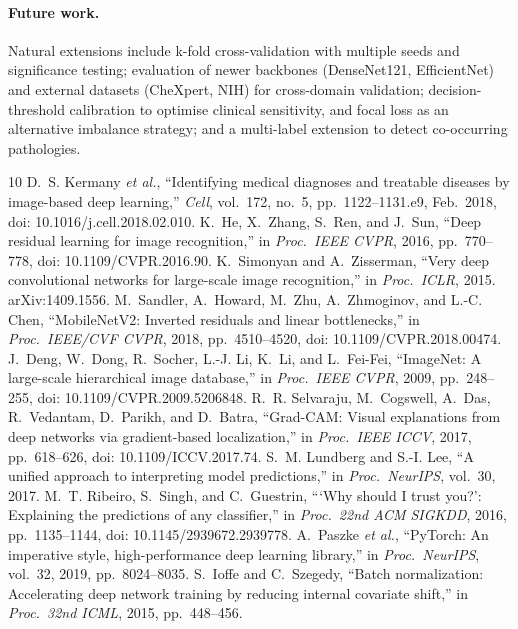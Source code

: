 \documentclass[11pt,a4paper]{article}
\numberwithin{figure}{section}
\numberwithin{table}{section}
\begin{document}
\paragraph{Future work.} Natural extensions include k-fold cross-validation with multiple seeds and
significance testing; evaluation of newer backbones (DenseNet121, EfficientNet) and external datasets
(CheXpert, NIH) for cross-domain validation; decision-threshold calibration to optimise clinical
sensitivity, and focal loss as an alternative imbalance strategy; and a multi-label extension to detect
co-occurring pathologies.

\clearpage
{}
{}
\begin{thebibliography}{10}
 D.~S. Kermany \textit{et al.}, ``Identifying medical diagnoses and treatable diseases by image-based deep learning,'' \textit{Cell}, vol.~172, no.~5, pp.~1122--1131.e9, Feb.\ 2018, doi: 10.1016/j.cell.2018.02.010.
 K.~He, X.~Zhang, S.~Ren, and J.~Sun, ``Deep residual learning for image recognition,'' in \textit{Proc.\ IEEE CVPR}, 2016, pp.~770--778, doi: 10.1109/CVPR.2016.90.
 K.~Simonyan and A.~Zisserman, ``Very deep convolutional networks for large-scale image recognition,'' in \textit{Proc.\ ICLR}, 2015. arXiv:1409.1556.
 M.~Sandler, A.~Howard, M.~Zhu, A.~Zhmoginov, and L.-C. Chen, ``MobileNetV2: Inverted residuals and linear bottlenecks,'' in \textit{Proc.\ IEEE/CVF CVPR}, 2018, pp.~4510--4520, doi: 10.1109/CVPR.2018.00474.
 J.~Deng, W.~Dong, R.~Socher, L.-J. Li, K.~Li, and L.~Fei-Fei, ``ImageNet: A large-scale hierarchical image database,'' in \textit{Proc.\ IEEE CVPR}, 2009, pp.~248--255, doi: 10.1109/CVPR.2009.5206848.
 R.~R. Selvaraju, M.~Cogswell, A.~Das, R.~Vedantam, D.~Parikh, and D.~Batra, ``Grad-CAM: Visual explanations from deep networks via gradient-based localization,'' in \textit{Proc.\ IEEE ICCV}, 2017, pp.~618--626, doi: 10.1109/ICCV.2017.74.
 S.~M. Lundberg and S.-I. Lee, ``A unified approach to interpreting model predictions,'' in \textit{Proc.\ NeurIPS}, vol.~30, 2017.
 M.~T. Ribeiro, S.~Singh, and C.~Guestrin, ```Why should I trust you?': Explaining the predictions of any classifier,'' in \textit{Proc.\ 22nd ACM SIGKDD}, 2016, pp.~1135--1144, doi: 10.1145/2939672.2939778.
 A.~Paszke \textit{et al.}, ``PyTorch: An imperative style, high-performance deep learning library,'' in \textit{Proc.\ NeurIPS}, vol.~32, 2019, pp.~8024--8035.
 S.~Ioffe and C.~Szegedy, ``Batch normalization: Accelerating deep network training by reducing internal covariate shift,'' in \textit{Proc.\ 32nd ICML}, 2015, pp.~448--456.
\end{thebibliography}
\appendix
\end{document}
